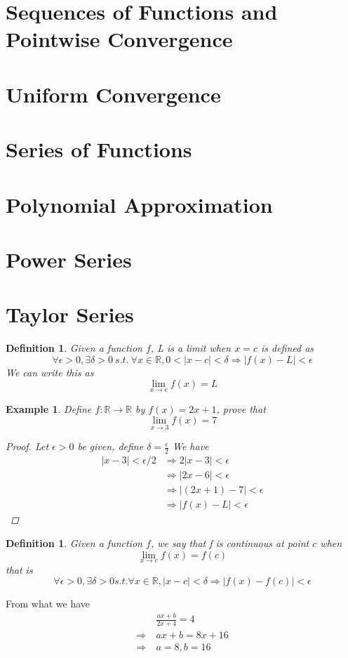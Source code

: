 \documentclass{book}
\newtheorem{definition}[theorem]{Definition}
\newtheorem{example}[theorem]{Example}
\begin{document}
\section{Sequences of Functions and Pointwise Convergence}
\section{Uniform Convergence}
\section{Series of Functions}
\section{Polynomial Approximation}
\section{Power Series}
\section{Taylor Series}


\begin{definition}

Given a function $f$, L is a limit when $x=c$ is defined as 
$$\forall\epsilon>0, \exists\delta>0 \ s.t. \ \forall x\in\mathbb{R}, 0<|x-c|<\delta \Rightarrow |f(x)-L|<\epsilon$$
We can write this as
$$\lim_{x\rightarrow c}f(x)=L$$ 
\end{definition}

\begin{example}
Define $f : \mathbb{R} \rightarrow \mathbb{R}$ by $f(x) = 2x + 1$, prove that $$\lim_{x \rightarrow 3}f(x) = 7$$
\begin{proof}
Let $\epsilon > 0$ be given, define $\delta = \frac{\epsilon}{2}$
We have
\begin{align*}
|x-3| < \epsilon/2 & \Rightarrow  2|x-3| < \epsilon\\
&\Rightarrow  |2x-6| < \epsilon\\
&\Rightarrow  |(2x+1)-7| < \epsilon\\
&\Rightarrow  |f(x)-L| < \epsilon
\end{align*}
\end{proof}
\end{example}

\begin{definition}
Given a function $f$, we say that f is continuous at point $c$ when 
$$\lim_{x\rightarrow c}f(x)=f(c)$$ 
that is
$$\forall\epsilon>0, \exists\delta>0 s.t. \forall x\in\mathbb{R}, |x-c|<\delta \Rightarrow |f(x)-f(c)|<\epsilon$$
\end{definition}
From what we have
\begin{align*}
&\frac{ax + b}{2x + 4} = 4\\
\Rightarrow \ & ax + b = 8x + 16\\
\Rightarrow \ & a = 8, b = 16\\  
\end{align*}
\end{document}
